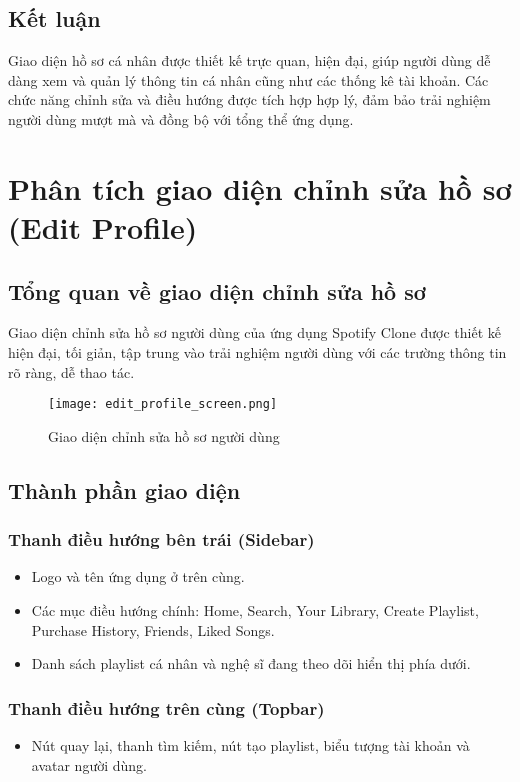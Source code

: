 \documentclass{book}
\let\oldsection\section
\renewcommand{\section}{\clearpage\oldsection}
\begin{document}
\subsection{Kết luận}
Giao diện hồ sơ cá nhân được thiết kế trực quan, hiện đại, giúp người dùng dễ dàng xem và quản lý thông tin cá nhân cũng như các thống kê tài khoản. Các chức năng chỉnh sửa và điều hướng được tích hợp hợp lý, đảm bảo trải nghiệm người dùng mượt mà và đồng bộ với tổng thể ứng dụng.
\section{Phân tích giao diện chỉnh sửa hồ sơ (Edit Profile)}

\subsection{Tổng quan về giao diện chỉnh sửa hồ sơ}
Giao diện chỉnh sửa hồ sơ người dùng của ứng dụng Spotify Clone được thiết kế hiện đại, tối giản, tập trung vào trải nghiệm người dùng với các trường thông tin rõ ràng, dễ thao tác.

\begin{figure}[h!]
\centering
\texttt{[image: edit\_profile\_screen.png]} %
\caption{Giao diện chỉnh sửa hồ sơ người dùng}
\label{fig:editprofile}
\end{figure}

\subsection{Thành phần giao diện}

\subsubsection{Thanh điều hướng bên trái (Sidebar)}
\begin{itemize}
    \item Logo và tên ứng dụng ở trên cùng.
    \item Các mục điều hướng chính: Home, Search, Your Library, Create Playlist, Purchase History, Friends, Liked Songs.
    \item Danh sách playlist cá nhân và nghệ sĩ đang theo dõi hiển thị phía dưới.
\end{itemize}

\subsubsection{Thanh điều hướng trên cùng (Topbar)}
\begin{itemize}
    \item Nút quay lại, thanh tìm kiếm, nút tạo playlist, biểu tượng tài khoản và avatar người dùng.
\end{itemize}
\end{document}
